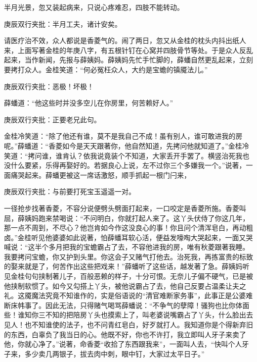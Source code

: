 \begin{parag}
    半月光景，忽又装起病来，只说心疼难忍，四肢不能转动。\begin{note}庚辰双行夹批：半月工夫，诸计安矣。\end{note}请医疗治不效，众人都说是香菱气的。闹了两日，忽又从金桂的枕头内抖出纸人来，上面写著金桂的年庚八字，有五根针钉在心窝并四肢骨节等处。于是众人反乱起来，当作新闻，先报与薛姨妈。薛姨妈先忙手忙脚的，薛蟠自然更乱起来，立刻要拷打众人。金桂笑道：“何必冤枉众人，大约是宝蟾的镇魇法儿。”\begin{note}庚辰双行夹批：恶极！坏极！\end{note}薛蟠道：“他这些时并没多空儿在你房里，何苦赖好人。”\begin{note}庚辰双行夹批：正要老兄此句。\end{note}金桂冷笑道：“除了他还有谁，莫不是我自己不成！虽有别人，谁可敢进我的房呢。”薛蟠道：“香菱如今是天天跟著你，他自然知道，先拷问他就知道了。”金桂冷笑道：“拷问谁，谁肯认？依我说竟装个不知道，大家丢开手罢了。横竖治死我也没什么要紧，乐得再娶好的。若据良心上说，左不过你三个多嫌我一个。”说著，一面痛哭起来。薛蟠更被这一席话激怒，顺手抓起一根门闩来，\begin{note}庚辰双行夹批：与前要打死宝玉遥遥一对。\end{note}一径抢步找著香菱，不容分说便劈头劈面打起来，一口咬定是香菱所施。香菱叫屈，薛姨妈跑来禁喝说：“不问明白，你就打起人来了。这丫头伏侍了你这几年，那一点不周到，不尽心？他岂肯如今作这没良心的事！你且问个清浑皂白，再动粗卤。”金桂听见他婆婆如此说著，怕薛蟠耳软心活，便益发嚎啕大哭起来，一面又哭喊说：“这半个多月把我的宝蟾霸占了去，不容他进我的房，唯有秋菱跟著我睡。我要拷问宝蟾，你又护到头里。你这会子又赌气打他去。治死我，再拣富贵的标致的娶来就是了，何苦作出这些把戏来！”薛蟠听了这些话，越发著了急。薛姨妈听见金桂句句挟制著儿子，百般恶赖的样子，十分可恨。无奈儿子偏不硬气，已是被他挟制软惯了。如今又勾搭上丫头，被他说霸占了去，他自己反要占温柔让夫之礼。这魇魔法究竟不知谁作的，实是俗语说的“清官难断家务事”，此事正是公婆难断床帏事了。因此无法，只得赌气喝骂薛蟠说：“不争气的孽障！骚狗也比你体面些！谁知你三不知的把陪房丫头也摸索上了，叫老婆说嘴霸占了丫头，什么脸出去见人！也不知谁使的法子，也不问青红皂白，好歹就打人。我知道你是个得新弃旧的东西，白辜负了我当日的心。他既不好，你也不许打，我立即叫人牙子来卖了他，你就心净了。”说著，命香菱“收拾了东西跟我来”，一面叫人去，“快叫个人牙子来，多少卖几两银子，拔去肉中刺，眼中钉，大家过太平日子。” 
\end{parag}
